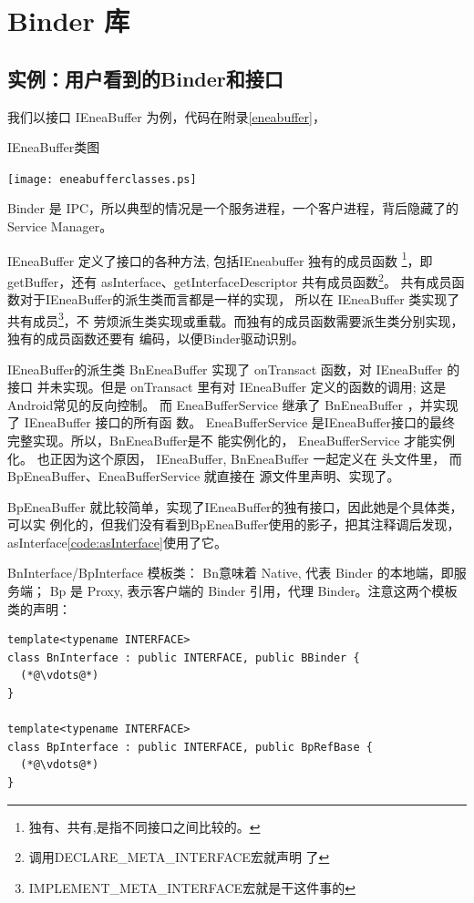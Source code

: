 \documentclass[a4paper,11pt]{article}
\begin{document}
\section{Binder 库}
\subsection{实例：用户看到的Binder和接口}

我们以接口 IEneaBuffer 为例，代码在附录\ref{eneabuffer}，

\caption{IEneaBuffer类图}
\texttt{[image: eneabufferclasses.ps]}

Binder 是 IPC，所以典型的情况是一个服务进程，一个客户进程，背后隐藏了的Service
Manager。

IEneaBuffer 定义了接口的各种方法, 包括IEneabuffer 独有的成员函数
\footnote{独有、共有,是指不同接口之间比较的。}，即 getBuffer，还有 
asInterface、getInterfaceDescriptor 共有成员函数\footnote{调用DECLARE_META_INTERFACE宏就声明
了}。
共有成员函数对于IEneaBuffer的派生类而言都是一样的实现，
所以在 IEneaBuffer 类实现了共有成员\footnote{IMPLEMENT_META_INTERFACE宏就是干这件事的}，不
劳烦派生类实现或重载。而独有的成员函数需要派生类分别实现，独有的成员函数还要有
编码，以便Binder驱动识别。

IEneaBuffer的派生类 BnEneaBuffer 实现了 onTransact 函数，对 IEneaBuffer 的接口
并未实现。但是 onTransact 里有对 IEneaBuffer 定义的函数的调用; 这是Android常见的反向控制。
而 EneaBufferService 继承了 BnEneaBuffer ，并实现了 IEneaBuffer 接口的所有函
数。 EneaBufferService 是IEneaBuffer接口的最终完整实现。所以，BnEneaBuffer是不
能实例化的， EneaBufferService 才能实例化。 也正因为这个原因， IEneaBuffer,
BnEneaBuffer 一起定义在 头文件里， 而 BpEneaBuffer、EneaBufferService 就直接在
源文件里声明、实现了。


BpEneaBuffer 就比较简单，实现了IEneaBuffer的独有接口，因此她是个具体类，可以实
例化的，但我们没有看到BpEneaBuffer使用的影子，把其注释调后发现，asInterface\ref{code:asInterface}使用了它。


BnInterface/BpInterface 模板类：
Bn意味着 Native, 代表 Binder 的本地端，即服务端； Bp 是 Proxy, 表示客户端的
Binder 引用，代理 Binder。注意这两个模板类的声明：
\begin{lstlisting}
template<typename INTERFACE>
class BnInterface : public INTERFACE, public BBinder {
  (*@\vdots@*)
}

template<typename INTERFACE>
class BpInterface : public INTERFACE, public BpRefBase {
  (*@\vdots@*)
}
\end{lstlisting}
\end{document}
